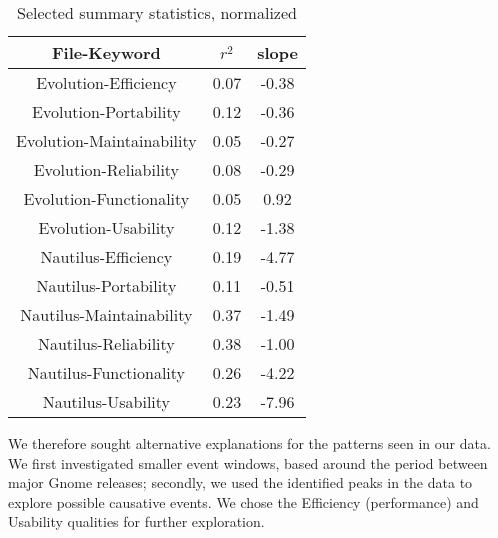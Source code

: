 \documentclass[conference, compsoc]{IEEEtran}
\begin{document}
\begin{table}
	\caption{Selected summary statistics, normalized}
	\centering
	\label{tbl:summary}
\begin{tabular}{|c|c|c|}
\hline
\rowcolor[gray]{.9} 
File-Keyword &  $r^2$ &  slope \\ \hline
Evolution-Efficiency & 0.07 & -0.38 \\
Evolution-Portability & 0.12 & -0.36 \\
Evolution-Maintainability & 0.05 & -0.27 \\
Evolution-Reliability & 0.08 & -0.29 \\
Evolution-Functionality & 0.05 & 0.92 \\
Evolution-Usability & 0.12 & -1.38 \\
Nautilus-Efficiency & 0.19 & -4.77 \\
Nautilus-Portability & 0.11 & -0.51 \\
Nautilus-Maintainability & 0.37 & -1.49 \\
Nautilus-Reliability & 0.38 & -1.00 \\
Nautilus-Functionality & 0.26 & -4.22 \\
Nautilus-Usability & 0.23 & -7.96 \\
\hline
\end{tabular}
\end{table}

We therefore sought alternative explanations for the patterns seen in our data. We first investigated smaller event windows, based around the period between major Gnome releases; secondly, we used the identified peaks in the data to explore possible causative events. We chose the Efficiency (performance) and Usability qualities for further exploration.
\end{document}
